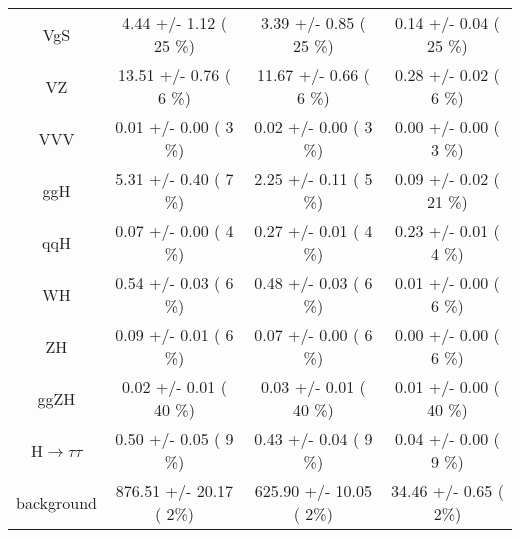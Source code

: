 \begin{table}[h!]
\begin{center}
{\begin{tabular}{
c| c | c | c }
     VgS                &      4.44 +/-       1.12 (        25 \%)              &       3.39 +/-       0.85 (        25 \%)             &      0.14 +/-       0.04 (        25 \%)               \\
     VZ                &     13.51 +/-       0.76 (         6 \%)              &      11.67 +/-       0.66 (         6 \%)             &      0.28 +/-       0.02 (         6 \%)               \\
     VVV                &      0.01 +/-       0.00 (         3 \%)              &       0.02 +/-       0.00 (         3 \%)             &      0.00 +/-       0.00 (         3 \%)               \\   
 ggH                &      5.31 +/-       0.40 (         7 \%)              &       2.25 +/-       0.11 (         5 \%)             &      0.09 +/-       0.02 (        21 \%)               \\
 qqH                &      0.07 +/-       0.00 (         4 \%)              &       0.27 +/-       0.01 (         4 \%)             &      0.23 +/-       0.01 (         4 \%)               \\
  WH                &      0.54 +/-       0.03 (         6 \%)              &       0.48 +/-       0.03 (         6 \%)             &      0.01 +/-       0.00 (         6 \%)               \\
  ZH                &      0.09 +/-       0.01 (         6 \%)              &       0.07 +/-       0.00 (         6 \%)             &      0.00 +/-       0.00 (         6 \%)               \\   
 ggZH                &      0.02 +/-       0.01 (        40 \%)              &       0.03 +/-       0.01 (        40 \%)             &      0.01 +/-       0.00 (        40 \%)               \\
 H$\to\tau\tau$                &      0.50 +/-       0.05 (         9 \%)              &       0.43 +/-       0.04 (         9 \%)             &      0.04 +/-       0.00 (         9 \%)               \\
      
\hline                                                                                                                                       
    background          &    876.51 +/-      20.17 (         2\%)               &     625.90 +/-      10.05 (         2\%)              &     34.46 +/-       0.65 (         2\%)               \\
\hline
\end{tabular}
}
\end{center}

\end{table}



